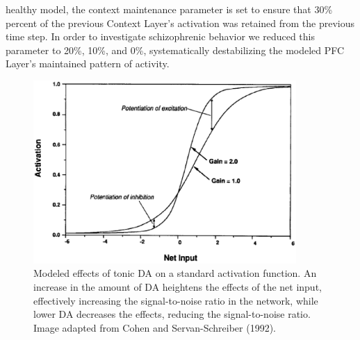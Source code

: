 healthy model, the context maintenance parameter is set to ensure that 30\% percent of the previous Context Layer's activation was retained from the previous time step.  In order to investigate schizophrenic behavior we reduced this parameter to 20\%, 10\%, and 0\%, systematically destabilizing the modeled PFC Layer's maintained pattern of activity. 

\begin{figure}[tp]
\begin{center}
	\includegraphics[width=100mm]{figures/gain_manipulation.eps}
\end{center}
\caption{Modeled effects of tonic DA on a standard activation function. An increase in the amount of DA heightens the effects of the net input, effectively increasing the signal-to-noise ratio in the network, while lower DA decreases the effects, reducing the signal-to-noise ratio. Image adapted from Cohen and Servan-Schreiber (1992).}
\label{gain-manipulation}
\end{figure} 

